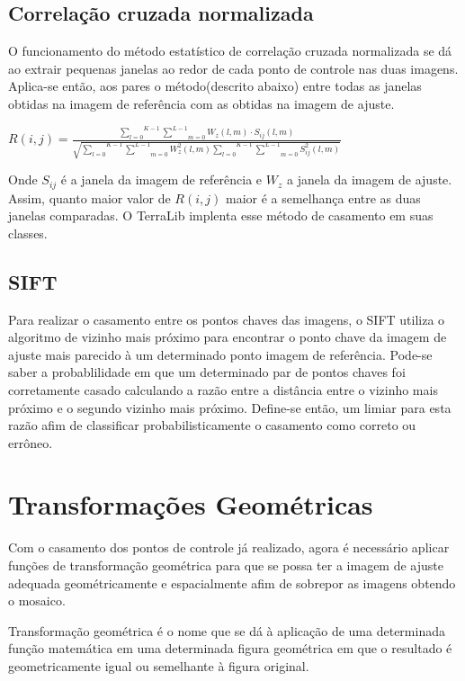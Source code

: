 \documentclass[9pt, a4paper, nofonttune, journal]{IEEEtran}
\begin{document}
\subsection{Correlação cruzada normalizada}
O funcionamento do método estatístico de correlação cruzada normalizada se dá ao extrair pequenas janelas ao redor de cada ponto de controle nas duas imagens.
Aplica-se então, aos pares o método(descrito abaixo) entre todas as janelas obtidas na imagem de referência com as obtidas na imagem de ajuste.\cite{Fedorov1}\cite{Leila1}\cite{Zhao1}
\begin{center}
$R(i,j)=\frac{\overset{K-1}{\underset{l=0}{\sum}}\underset{m=0}{\overset{L-1}{\sum}}W_{z}(l,m)\cdot S_{ij}(l,m)}{\sqrt{\overset{K-1}{\underset{l=0}{\sum}}\underset{m=0}{\overset{L-1}{\sum}}W_{z}^{2}(l,m)\overset{K-1}{\underset{l=0}{\sum}}\underset{m=0}{\overset{L-1}{\sum}}S_{ij}^{2}(l,m)}}$\end{center}
Onde $S_{ij}$ é a janela da imagem de referência e $W_{z}$ a janela da imagem de ajuste.
Assim, quanto maior valor de $R(i,j)$ maior é a semelhança entre as duas janelas comparadas.
O TerraLib implenta esse método de casamento em suas classes.

\subsection{SIFT}
Para realizar o casamento entre os pontos chaves das imagens,
o SIFT utiliza o algoritmo de vizinho mais próximo para encontrar o ponto chave da imagem de ajuste mais parecido à um determinado ponto imagem de referência.
Pode-se saber a probablilidade em que um determinado par de pontos chaves foi corretamente casado calculando a razão entre a distância entre o vizinho mais próximo e o segundo vizinho mais próximo.
Define-se então, um limiar para esta razão afim de classificar probabilisticamente o casamento como correto ou errôneo.\cite{Lowe2}\cite{Lowe3}

\section{Transformações Geométricas}
Com o casamento dos pontos de controle já realizado, agora é necessário aplicar funções de transformação geométrica para que se possa ter a imagem de ajuste
adequada geométricamente e espacialmente afim de sobrepor as imagens obtendo o mosaico.

Transformação geométrica é o nome que se dá à aplicação de uma determinada função matemática em uma determinada figura geométrica 
em que o resultado é geometricamente igual ou semelhante à figura original.
\end{document}
